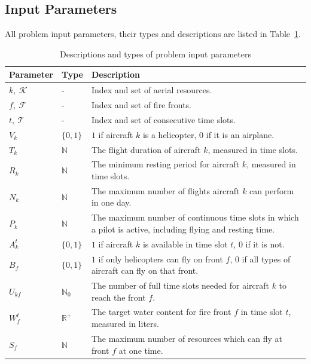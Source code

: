 \subsection{Input Parameters}

All problem input parameters, their types and descriptions are listed in Table~\ref{tbl:input-params}.

\begin{table}[htb]
\caption{Descriptions and types of problem input parameters}
\label{tbl:input-params}
\small
\centering
\begin{tabularx}{\hsize}{@{}llX@{}}
Parameter & Type & Description \\
\midrule
$k,\ \mathcal{K}$ & -              & Index and set of aerial resources. \\
$f,\ \mathcal{F}$ & -              & Index and set of fire fronts. \\
$t,\ \mathcal{T}$ & -              & Index and set of consecutive time slots. \\
$V_k$             & $\{0,1\}$      & $1$ if aircraft $k$ is a helicopter, $0$ if it is an airplane. \\
$T_k$             & $\mathbb{N}$   & The flight duration of aircraft $k$, measured in time slots. \\
$R_k$             & $\mathbb{N}$   & The minimum resting period for aircraft $k$, measured in time slots. \\
$N_k$             & $\mathbb{N}$   & The maximum number of flights aircraft $k$ can perform in one day. \\
$P_k$             & $\mathbb{N}$   & The maximum number of continuous time slots in which a pilot is active, including flying and resting time. \\
$A_k^t$           & $\{0,1\}$      & $1$ if aircraft $k$ is available in time slot $t$, $0$ if it is not. \\
$B_{f}$           & $\{0,1\}$      & $1$ if only helicopters can fly on front $f$, $0$ if all types of aircraft can fly on that front. \\
$U_{kf}$          & $\mathbb{N}_0$ & The number of full time slots needed for aircraft $k$ to reach the front $f$. \\
$W_f^t$           & $\mathbb{R}^+$ & The target water content for fire front $f$ in time slot $t$, measured in liters. \\
$S_f$             & $\mathbb{N}$   & The maximum number of resources which can fly at front $f$ at one time. \\

\end{tabularx}
\end{table}

